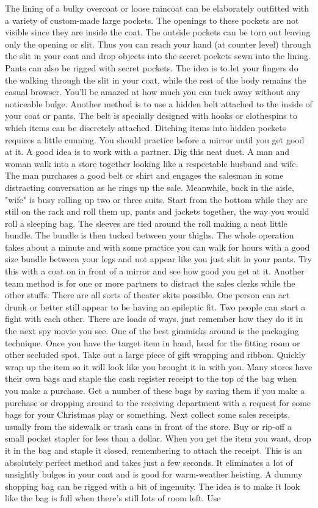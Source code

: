 \documentclass[11pt,twoside,a4paper]{book}
\begin{document}
The lining of a bulky overcoat or loose raincoat can be elaborately outfitted with a variety of custom-made large pockets. The openings to these pockets are not visible since they are inside the coat. The outside pockets can be torn out leaving only the opening or slit. Thus you can reach your hand (at counter level) through the slit in your coat and drop objects into the secret pockets sewn into the lining. Pants can also be rigged with secret pockets. The idea is to let your fingers do the walking through the slit in your coat, while the rest of the body remains the casual browser. You'll be amazed at how much you can tuck away without any noticeable bulge. Another method is to use a hidden belt attached to the inside of your coat or pants. The belt is specially designed with hooks or clothespins to which items can be discretely attached. Ditching items into hidden pockets requires a little cunning. You should practice before a mirror until you get good at it. A good idea is to work with a partner. Dig this neat duet. A man and woman walk into a store together looking like a respectable husband and wife. The man purchases a good belt or shirt and engages the salesman in some distracting conversation as he rings up the sale. Meanwhile, back in the aisle, "wife" is busy rolling up two or three suits. Start from the bottom while they are still on the rack and roll them up, pants and jackets together, the way you would roll a sleeping bag. The sleeves are tied around the roll making a neat little bundle. The bundle is then tucked between your thighs. The whole operation takes about a minute and with some practice you can walk for hours with a good size bundle between your legs and not appear like you just shit in your pants. Try this with a coat on in front of a mirror and see how good you get at it. Another team method is for one or more partners to distract the sales clerks while the other stuffs. There are all sorts of theater skits possible. One person can act drunk or better still appear to be having an epileptic fit. Two people can start a fight with each other. There are loads of ways, just remember how they do it in the next spy movie you see. One of the best gimmicks around is the packaging technique. Once you have the target item in hand, head for the fitting room or other secluded spot. Take out a large piece of gift wrapping and ribbon. Quickly wrap up the item so it will look like you brought it in with you. Many stores have their own bags and staple the cash register receipt to the top of the bag when you make a purchase. Get a number of these bags by saving them if you make a purchase or dropping around to the receiving department with a request for some bags for your Christmas play or something. Next collect some sales receipts, usually from the sidewalk or trash cans in front of the store. Buy or rip-off a small pocket stapler for less than a dollar. When you get the item you want, drop it in the bag and staple it closed, remembering to attach the receipt. This is an absolutely perfect method and takes just a few seconds. It eliminates a lot of unsightly bulges in your coat and is good for warm-weather heisting. A dummy shopping bag can be rigged with a bit of ingenuity. The idea is to make it look like the bag is full when there's still lots of room left. Use 
\end{document}
